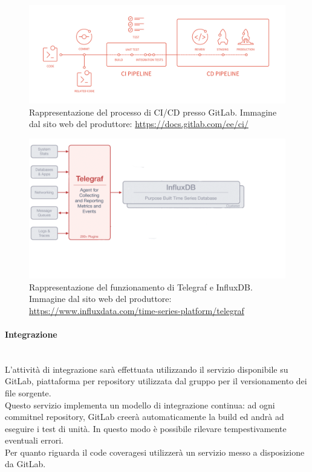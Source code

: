 \begin{figure}[H]
	\begin{center}
		\includegraphics[scale=0.18]{./images/cicd_pipeline_gitlab.png}
		\caption{Rappresentazione del processo di CI/CD presso GitLab. Immagine dal sito web del produttore: \url{https://docs.gitlab.com/ee/ci/}}
	\end{center}
\end{figure}

\begin{figure}[H]
	\begin{center}
		\includegraphics[scale=0.4]{./images/influxTelegraf.png}
		\caption{Rappresentazione del funzionamento di Telegraf e InfluxDB. Immagine dal sito web del produttore: \url{https://www.influxdata.com/time-series-platform/telegraf}}
	\end{center}
\end{figure}

\paragraph{Integrazione}\label{Progettazione_Integrazione}\-\\
L'attività di integrazione sarà effettuata utilizzando il servizio disponibile su GitLab\glossario, piattaforma per repository utilizzata dal gruppo per il versionamento dei file sorgente.\\
Questo servizio implementa un modello di integrazione continua: ad ogni commit\glossario nel repository\glossario, GitLab creerà automaticamente la build ed andrà ad eseguire i test di unità. In questo modo è possibile rilevare tempestivamente eventuali errori.\\
Per quanto riguarda il code coverage\glossario si utilizzerà un servizio messo a disposizione da GitLab.\\

